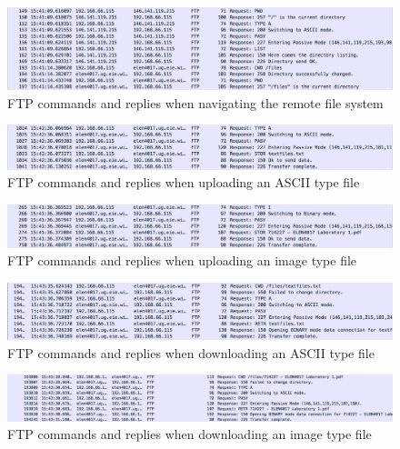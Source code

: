 \documentclass[10pt,twocolumn]{witseiepaper}
\begin{document}
\begin{appendix}
\begin{figure}[h]
	\centering
	\includegraphics[width=1\textwidth]{navigateWits.png}
	\caption{FTP commands and replies when navigating the remote file system}
	\raggedright
	\label{fig:navigateWits}	
\end{figure}

\begin{figure}[h]
	\centering
	\includegraphics[width=1\textwidth]{textUploadWits.png}
	\caption{FTP commands and replies when uploading an ASCII type file}
	\raggedright
	\label{fig:textUploadWits}	
\end{figure}

\begin{figure}[h]
	\centering
	\includegraphics[width=1\textwidth]{binaryUploadWits.png}
	\caption{FTP commands and replies when uploading an image type file}
	\raggedright
	\label{fig:binaryUploadWits}	
\end{figure}

\begin{figure}[h]
	\centering
	\includegraphics[width=1\textwidth]{downloadTextWits.png}
	\caption{FTP commands and replies when downloading an ASCII type file}
	\raggedright
	\label{fig:textDownloadWits}	
\end{figure}

\begin{figure}[h]
	\centering
	\includegraphics[width=1\textwidth]{downloadImageWits.png}
	\caption{FTP commands and replies when downloading an image type file}
	\raggedright
	\label{fig:binaryDownloadWits}	
\end{figure}


\end{appendix}
\end{document}
